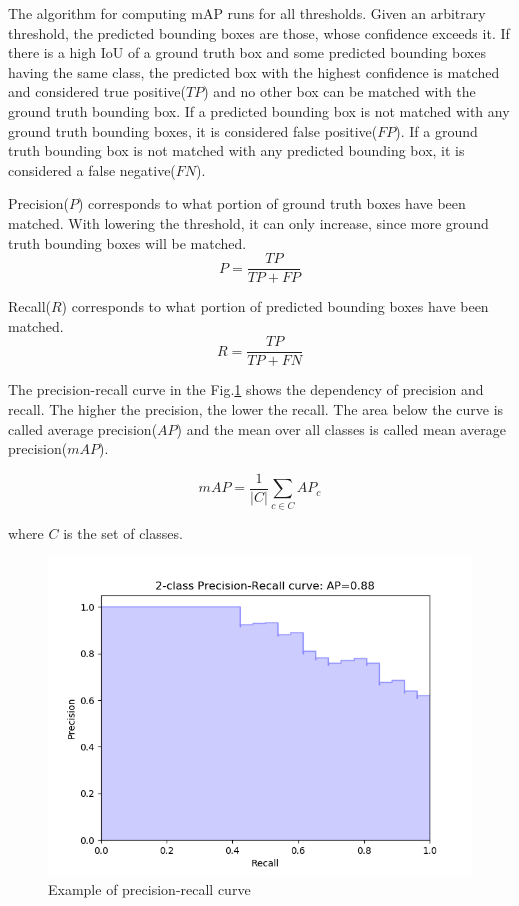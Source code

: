 \documentclass[a4paper,12pt,titlepage, twoside]{article}
\numberwithin{figure}{section}
\begin{document}
The algorithm for computing mAP runs for all thresholds. Given an arbitrary threshold, the predicted bounding boxes are those, whose confidence exceeds it. If there is a high IoU of a ground truth box and some predicted bounding boxes having the same class, the predicted box with the highest confidence is matched and considered true positive($TP$) and no other box can be matched with the ground truth bounding box. If a predicted bounding box is not matched with any ground truth bounding boxes, it is considered false positive($FP$). If a ground truth bounding box is not matched with any predicted bounding box, it is considered a false negative($FN$).

Precision($P$) corresponds to what portion of ground truth boxes have been matched. With lowering the threshold, it can only increase, since more ground truth bounding boxes will be matched.
\begin{equation}
P = \frac{TP}{TP + FP}
\end{equation}

Recall($R$) corresponds to what portion of predicted bounding boxes have been matched. 
\begin{equation}
R = \frac{TP}{TP + FN}
\end{equation}

The precision-recall curve in the Fig.\ref{fig:precision-recall} shows the dependency of precision and recall. The higher the precision, the lower the recall. The area below the curve is called average precision($AP$) and the mean over all classes is called mean average precision($mAP$).

\begin{equation}
mAP = \frac{1}{|C|} \sum_{c \in C} AP_c
\end{equation}

where $C$ is the set of classes.

\begin{figure}[H]
\centering
\includegraphics[width=1\linewidth]{fig/precision-recall.png}
\caption{Example of precision-recall curve}
\label{fig:precision-recall}
\end{figure}
\end{document}
